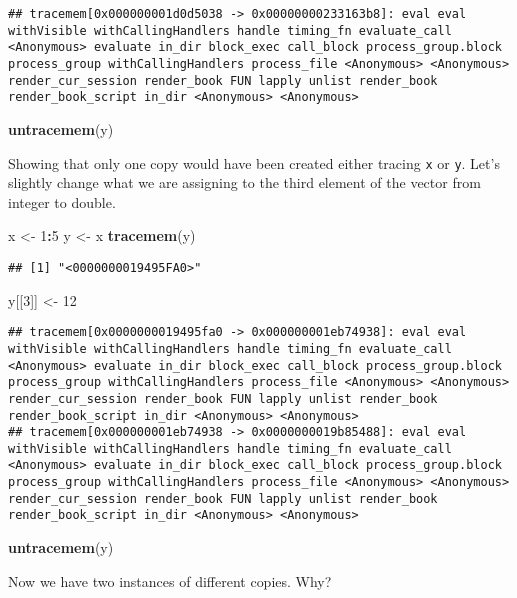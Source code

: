 \documentclass[]{book}
\newenvironment{Shaded}{\begin{snugshade}}{\end{snugshade}}
\newcommand{\DecValTok}[1]{\textcolor[rgb]{0.00,0.00,0.81}{#1}}
\newcommand{\KeywordTok}[1]{\textcolor[rgb]{0.13,0.29,0.53}{\textbf{#1}}}
\newcommand{\NormalTok}[1]{#1}
\newcommand{\OperatorTok}[1]{\textcolor[rgb]{0.81,0.36,0.00}{\textbf{#1}}}
\newcommand{\StringTok}[1]{\textcolor[rgb]{0.31,0.60,0.02}{#1}}
\begin{document}
\begin{verbatim}
## tracemem[0x000000001d0d5038 -> 0x00000000233163b8]: eval eval withVisible withCallingHandlers handle timing_fn evaluate_call <Anonymous> evaluate in_dir block_exec call_block process_group.block process_group withCallingHandlers process_file <Anonymous> <Anonymous> render_cur_session render_book FUN lapply unlist render_book render_book_script in_dir <Anonymous> <Anonymous>
\end{verbatim}

\begin{Shaded}
\begin{Highlighting}[]
\KeywordTok{untracemem}\NormalTok{(y)}
\end{Highlighting}
\end{Shaded}

Showing that only one copy would have been created either tracing \texttt{x} or \texttt{y}. Let's slightly change what we are assigning to the third element of the vector from integer to double.

\begin{Shaded}
\begin{Highlighting}[]
\NormalTok{x <-}\StringTok{ }\DecValTok{1}\OperatorTok{:}\DecValTok{5}
\NormalTok{y <-}\StringTok{ }\NormalTok{x}
\KeywordTok{tracemem}\NormalTok{(y)}
\end{Highlighting}
\end{Shaded}

\begin{verbatim}
## [1] "<0000000019495FA0>"
\end{verbatim}

\begin{Shaded}
\begin{Highlighting}[]
\NormalTok{y[[}\DecValTok{3}\NormalTok{]] <-}\StringTok{ }\DecValTok{12}
\end{Highlighting}
\end{Shaded}

\begin{verbatim}
## tracemem[0x0000000019495fa0 -> 0x000000001eb74938]: eval eval withVisible withCallingHandlers handle timing_fn evaluate_call <Anonymous> evaluate in_dir block_exec call_block process_group.block process_group withCallingHandlers process_file <Anonymous> <Anonymous> render_cur_session render_book FUN lapply unlist render_book render_book_script in_dir <Anonymous> <Anonymous> 
## tracemem[0x000000001eb74938 -> 0x0000000019b85488]: eval eval withVisible withCallingHandlers handle timing_fn evaluate_call <Anonymous> evaluate in_dir block_exec call_block process_group.block process_group withCallingHandlers process_file <Anonymous> <Anonymous> render_cur_session render_book FUN lapply unlist render_book render_book_script in_dir <Anonymous> <Anonymous>
\end{verbatim}

\begin{Shaded}
\begin{Highlighting}[]
\KeywordTok{untracemem}\NormalTok{(y)}
\end{Highlighting}
\end{Shaded}

Now we have two instances of different copies. Why?
\end{document}
